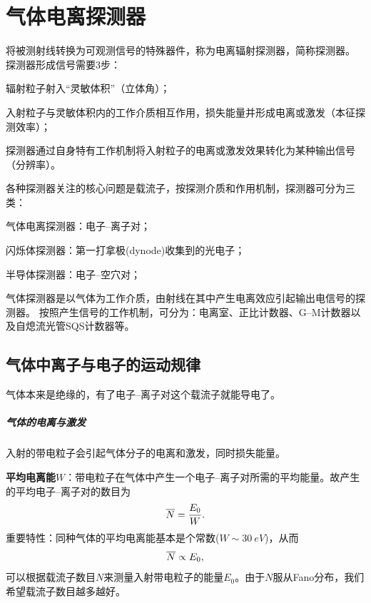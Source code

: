 \chapter{气体电离探测器}
将被测射线转换为可观测信号的特殊器件，称为电离辐射探测器，简称探测器。
探测器形成信号需要3步：
\begin{compactenum}
	\item 辐射粒子射入“灵敏体积”（立体角）；
	\item 入射粒子与灵敏体积内的工作介质相互作用，损失能量并形成电离或激发（本征探测效率）；
	\item 探测器通过自身特有工作机制将入射粒子的电离或激发效果转化为某种输出信号（分辨率）。
\end{compactenum}

各种探测器关注的核心问题是载流子，按探测介质和作用机制，探测器可分为三类：
\begin{compactitem}
	\item 气体电离探测器：电子--离子对；
	\item 闪烁体探测器：第一打拿极(dynode)收集到的光电子；
	\item 半导体探测器：电子--空穴对；
\end{compactitem}
气体探测器是以气体为工作介质，由射线在其中产生电离效应引起输出电信号的探测器。
按照产生信号的工作机制，可分为：电离室、正比计数器、G--M计数器以及自熄流光管SQS计数器等。

\section{气体中离子与电子的运动规律}

气体本来是绝缘的，有了电子--离子对这个载流子就能导电了。
\paragraph{气体的电离与激发}
入射的带电粒子会引起气体分子的电离和激发，同时损失能量。%

\textbf{平均电离能}$W$：带电粒子在气体中产生一个电子--离子对所需的平均能量。故产生的平均电子--离子对的数目为
\begin{align}
	\overline{N} = \frac{E_0}W.
\end{align}
重要特性：同种气体的平均电离能基本是个常数($W \sim \qty{30}{eV}$)，从而
\[
	\overline{N} \propto E_0,
\]
可以根据载流子数目$N$来测量入射带电粒子的能量$E_0$。由于$N$服从Fano分布，我们希望载流子数目越多越好。



